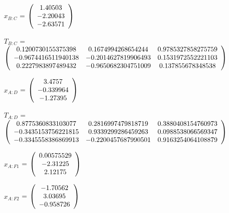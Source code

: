 \begin{description}
$x_{B:C}$ = $\left( \begin{array} {ccc}    1.40503 \\   -2.20043 \\   -2.63571
\end{array} \right)\\ \\$

$T_{B:C}$ = $\left( \begin{array} {ccc}
   0.1200730155375398 & 0.1674994268654244 & 0.9785327858275759 \\
   -0.9674416511940138 & -0.2014627819906493 & 0.1531972552221103 \\
   0.2227983897489432 & -0.9650682304751009 & 0.137855678348538 \\
\end{array} \right)\\ \\$

$x_{A:D}$ = $\left( \begin{array} {ccc}     3.4757 \\  -0.339964 \\   -1.27395
\end{array} \right)\\ \\$

$T_{A:D}$ = $\left( \begin{array} {ccc}
   0.8775360833103077 & 0.2816997479818719 & 0.3880408154760973 \\
   -0.3435153756221815 & 0.9339299286459263 & 0.0988538066569347 \\
   -0.3345558386869913 & -0.2200457687990501 & 0.9163254064108879 \\
\end{array} \right)\\ \\$

$x_{A:F1}$ = $\left( \begin{array} {ccc} 0.00575529 \\   -2.31225 \\    2.12175
\end{array} \right)\\ \\$

$x_{A:F2}$ = $\left( \begin{array} {ccc}   -1.70562 \\    3.03695 \\  -0.958726
\end{array} \right)\\ \\$


\end{description}
